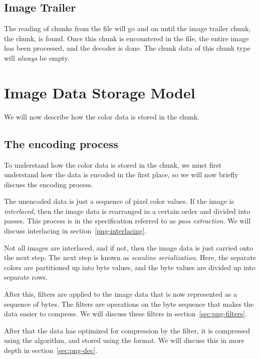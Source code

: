 \subsection{Image Trailer}

The reading of chunks from the \png file will go and on until the
image trailer chunk, the \iend chunk, is found. Once this chunk is
encountered in the file, the entire image has been processed, and the
decoder is done. The chunk data of this chunk type will
\textit{always} be empty.

\section{Image Data Storage Model}
\label{sec:png-image-data-storage}

We will now describe how the color data is stored in the \idat chunk.

\subsection{The encoding process}

To understand how the color data is stored in the \idat chunk, we must
first understand how the data is encoded in the first place, so we
will now briefly discuss the encoding process.

The unencoded data is just a sequence of pixel color values. If the
image is \textit{interlaced}, then the image data is rearranged in a
certain order and divided into passes. This process is in the \png
specification referred to as \textit{pass extraction}. We will discuss
interlacing in section~\ref{png-interlacing}.

Not all images are interlaced, and if not, then the image data is just
carried onto the next step. The next step is known as \textit{scanline
  serialization}. Here, the separate colors are partitioned up into
byte values, and the byte values are divided up into separate rows.

After this, filters are applied to the image data that is now
represented as a sequence of bytes. The filters are operations on the
byte sequence that makes the data easier to compress. We will discuss
these filters in section~\ref{sec:png-filters}.

After that the data has optimized for compression by the filter, it is
compressed using the  algorithm, and stored using the \zlib
format. We will discuss this in more depth in section~\ref{sec:png-dec}.


